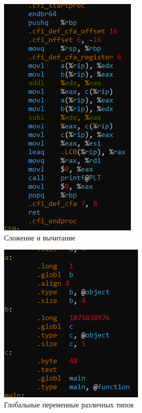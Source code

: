 \documentclass[a4paper,12pt]{article}
\begin{document}
\begin{figure}[h]
  \centering
  \includegraphics[width=0.8\linewidth]{images/asm0_3.png}
  \caption{Сложение и вычитание}
\end{figure}

\begin{figure}[h]
  \centering
  \includegraphics[width=0.8\linewidth]{images/asm0_4.png}
  \caption{Глобальные переменные различных типов}
\end{figure}
\end{document}
